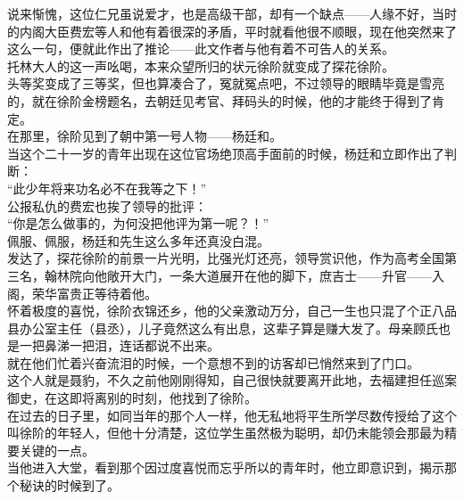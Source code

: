 \begin{multicols}{\theparacolNo}
说来惭愧，这位仁兄虽说爱才，也是高级干部，却有一个缺点——人缘不好，当时的内阁大臣费宏等人和他有着很深的矛盾，平时就看他很不顺眼，现在他突然来了这么一句，便就此作出了推论——此文作者与他有着不可告人的关系。\\

托林大人的这一声吆喝，本来众望所归的状元徐阶就变成了探花徐阶。\\

头等奖变成了三等奖，但也算凑合了，冤就冤点吧，不过领导的眼睛毕竟是雪亮的，就在徐阶金榜题名，去朝廷见考官、拜码头的时候，他的才能终于得到了肯定。\\

在那里，徐阶见到了朝中第一号人物——杨廷和。\\

当这个二十一岁的青年出现在这位官场绝顶高手面前的时候，杨廷和立即作出了判断：\\

“此少年将来功名必不在我等之下！”\\

公报私仇的费宏也挨了领导的批评：\\

“你是怎么做事的，为何没把他评为第一呢？！”\\

佩服、佩服，杨廷和先生这么多年还真没白混。\\

发达了，探花徐阶的前景一片光明，比强光灯还亮，领导赏识他，作为高考全国第三名，翰林院向他敞开大门，一条大道展开在他的脚下，庶吉士——升官——入阁，荣华富贵正等待着他。\\

怀着极度的喜悦，徐阶衣锦还乡，他的父亲激动万分，自己一生也只混了个正八品县办公室主任（县丞），儿子竟然这么有出息，这辈子算是赚大发了。母亲顾氏也是一把鼻涕一把泪，连话都说不出来。\\

就在他们忙着兴奋流泪的时候，一个意想不到的访客却已悄然来到了门口。\\

这个人就是聂豹，不久之前他刚刚得知，自己很快就要离开此地，去福建担任巡案御史，在这即将离别的时刻，他找到了徐阶。\\

在过去的日子里，如同当年的那个人一样，他无私地将平生所学尽数传授给了这个叫徐阶的年轻人，但他十分清楚，这位学生虽然极为聪明，却仍未能领会那最为精要关键的一点。\\

当他进入大堂，看到那个因过度喜悦而忘乎所以的青年时，他立即意识到，揭示那个秘诀的时候到了。\\


\end{multicols}
